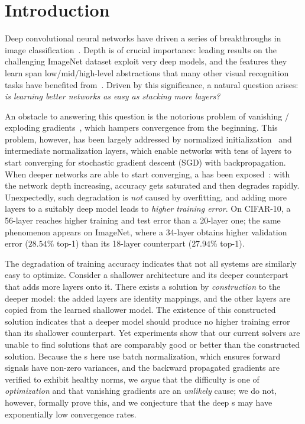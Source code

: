 \section{Introduction}
\label{sec:intro}

Deep convolutional neural networks have driven a series of breakthroughs in
image classification~\cite{alexnet2012}. Depth is of crucial importance: leading
results on the challenging ImageNet dataset exploit very deep models, and the
features they learn span low/mid/high-level abstractions that many other visual
recognition tasks have benefited from~\cite{zeiler2014}. Driven by this
significance, a natural question arises: \emph{is learning better networks as
easy as stacking more layers?}

An obstacle to answering this question is the notorious problem of vanishing /
exploding gradients~\cite{bengio1994}, which hampers convergence from the
beginning. This problem, however, has been largely addressed by normalized
initialization~\cite{glorot2010,lecun1989,saxe2013} and intermediate
normalization layers, which enable networks with tens of layers to start
converging for stochastic gradient descent (SGD) with backpropagation. When
deeper networks are able to start converging, a \degrad{} has been
exposed~\cite{constrainedtime2015}: with the network depth increasing, accuracy
gets saturated and then degrades rapidly. Unexpectedly, such degradation is
\emph{not} caused by overfitting, and adding more layers to a suitably deep
model leads to \emph{higher training error}. On CIFAR-10, a 56-layer
\plainnet{} reaches higher training and test error than a 20-layer one; the same
phenomenon appears on ImageNet, where a 34-layer \plainnet{} obtains higher
validation error ($28.54\%$ top-1) than its 18-layer counterpart ($27.94\%$
top-1).

The degradation of training accuracy indicates that not all systems are
similarly easy to optimize. Consider a shallower architecture and its deeper
counterpart that adds more layers onto it. There exists a solution by
\emph{construction} to the deeper model: the added layers are identity mappings,
and the other layers are copied from the learned shallower model. The existence
of this constructed solution indicates that a deeper model should produce no
higher training error than its shallower counterpart. Yet experiments show that
our current solvers are unable to find solutions that are comparably good or
better than the constructed solution. Because the \plainnet{}s here use batch
normalization, which ensures forward signals have non-zero variances, and the
backward propagated gradients are verified to exhibit healthy norms, we
\emph{argue} that the difficulty is one of \emph{optimization} and that
vanishing gradients are an \emph{unlikely} cause; we do not, however, formally
prove this, and we conjecture that the deep \plainnet{}s may have exponentially
low convergence rates.

